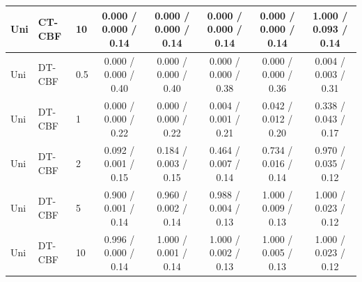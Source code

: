 \begin{tabular}{lllccccc}
Uni & CT-CBF & 10 & 0.000 / 0.000 / 0.14 & 0.000 / 0.000 / 0.14 & 0.000 / 0.000 / 0.14 & 0.000 / 0.000 / 0.14 & 1.000 / 0.093 / 0.14 \\
\hline
Uni & DT-CBF & 0.5 & 0.000 / 0.000 / 0.40 & 0.000 / 0.000 / 0.40 & 0.000 / 0.000 / 0.38 & 0.000 / 0.000 / 0.36 & 0.004 / 0.003 / 0.31 \\
Uni & DT-CBF & 1 & 0.000 / 0.000 / 0.22 & 0.000 / 0.000 / 0.22 & 0.004 / 0.001 / 0.21 & 0.042 / 0.012 / 0.20 & 0.338 / 0.043 / 0.17 \\
Uni & DT-CBF & 2 & 0.092 / 0.001 / 0.15 & 0.184 / 0.003 / 0.15 & 0.464 / 0.007 / 0.14 & 0.734 / 0.016 / 0.14 & 0.970 / 0.035 / 0.12 \\
Uni & DT-CBF & 5 & 0.900 / 0.001 / 0.14 & 0.960 / 0.002 / 0.14 & 0.988 / 0.004 / 0.13 & 1.000 / 0.009 / 0.13 & 1.000 / 0.023 / 0.12 \\
Uni & DT-CBF & 10 & 0.996 / 0.000 / 0.14 & 1.000 / 0.001 / 0.14 & 1.000 / 0.002 / 0.13 & 1.000 / 0.005 / 0.13 & 1.000 / 0.023 / 0.12 \\
\hline
\end{tabular}
